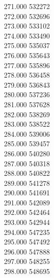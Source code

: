 { 271.000	532272 \\
 272.000	532696 \\
 273.000	533102 \\
 274.000	533490 \\
 275.000	535037 \\
 276.000	535643 \\
 277.000	535896 \\
 278.000	536458 \\
 279.000	536843 \\
 280.000	537236 \\
 281.000	537628 \\
 282.000	538269 \\
 283.000	538522 \\
 284.000	539006 \\
 285.000	539457 \\
 286.000	540280 \\
 287.000	540318 \\
 288.000	540822 \\
 289.000	541278 \\
 290.000	541691 \\
 291.000	542089 \\
 292.000	542464 \\
 293.000	542944 \\
 294.000	547235 \\
 295.000	547492 \\
 296.000	547888 \\
 297.000	548255 \\
 298.000	548695 \\
}
